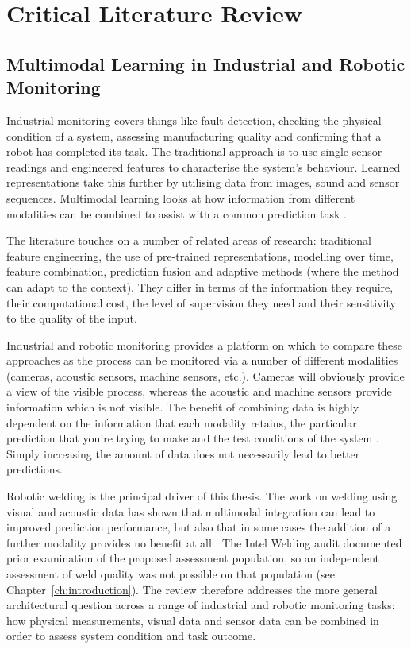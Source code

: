 \chapter{Critical Literature Review}

\label{ch:literature}

\section*{Multimodal Learning in Industrial and Robotic Monitoring}


Industrial monitoring covers things like fault detection, checking the physical condition of a
system, assessing manufacturing quality and confirming that a robot has completed its task. The
traditional approach is to use single sensor readings and engineered features to characterise the
system's behaviour. Learned representations take this further by utilising data from images, sound
and sensor sequences. Multimodal learning looks at how information from different modalities can be
combined to assist with a common prediction task
\citep{Baltrusaitis2019Multimodal,Huo2022Multisensor,Thoduka2024Handover}.

The literature touches on a number of related areas of research: traditional feature engineering,
the use of pre-trained representations, modelling over time, feature combination, prediction fusion
and adaptive methods (where the method can adapt to the context). They differ in terms of the
information they require, their computational cost, the level of supervision they need and their
sensitivity to the quality of the input.

Industrial and robotic monitoring provides a platform on which to compare these approaches as the
process can be monitored via a number of different modalities (cameras, acoustic sensors, machine
sensors, etc.). Cameras will obviously provide a view of the visible process, whereas the acoustic
and machine sensors provide information which is not visible. The benefit of combining data is
highly dependent on the information that each modality retains, the particular prediction that
you're trying to make and the test conditions of the system
\citep{Wang2020What,Hua2026Weld,Goodarzi2023Deep}. Simply increasing the amount of data does not
necessarily lead to better predictions.

Robotic welding is the principal driver of this thesis. The work on welding using visual and
acoustic data has shown that multimodal integration can lead to improved prediction performance, but
also that in some cases the addition of a further modality provides no benefit at all
\citep{P003,Hua2026Weld}. The Intel Welding audit documented prior examination of the proposed
assessment population, so an independent assessment of weld quality was not possible on that
population (see Chapter~\ref{ch:introduction}). The review therefore addresses the more general
architectural question across a range of industrial and robotic monitoring tasks: how physical
measurements, visual data and sensor data can be combined in order to assess system condition and
task outcome.

